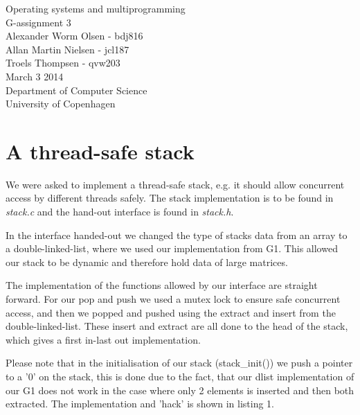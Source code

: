 \documentclass[12pt,a4paper,danish]{article}
\begin{document}
\lstset{language=C} 

\begin{titlepage}
    \vspace*{\fill}
    \begin{center}
      {\Huge Operating systems and multiprogramming}\\[0.7cm]
      {\huge G-assignment 3}\\[0.7cm]
      {\large Alexander Worm Olsen - bdj816}\\[0.4cm]
      {\large Allan Martin Nielsen - jcl187}\\[0.4cm]
      {\large Troels Thompsen - qvw203}\\[0.4cm]
      {\small March 3 2014}\\[0.3cm] 
      {\small Department of Computer Science}\\
      {\small University of Copenhagen}
    \end{center}
    \vspace*{\fill}
\end{titlepage}

\section{A thread-safe stack}
We were asked to implement a thread-safe stack, e.g. it should allow concurrent access by different threads safely. The stack implementation is to be found in \textit{stack.c} and the hand-out interface is found in \textit{stack.h}.

In the interface handed-out we changed the type of stacks data from an array to a double-linked-list, where we used our implementation from G1. This allowed our stack to be dynamic and therefore hold data of large matrices.

The implementation of the functions allowed by our interface are straight forward. For our pop and push we used a mutex lock to ensure safe concurrent access, and then we popped and pushed using the extract and insert from the double-linked-list. These insert and extract are all done to the head of the stack, which gives a first in-last out implementation.

Please note that in the initialisation of our stack (stack\_init()) we push a pointer to a '0' on the stack, this is done due to the fact, that our dlist implementation of our G1 does not work in the case where only 2 elements is inserted and then both extracted. The implementation and 'hack' is shown in listing 1.
\end{document}
